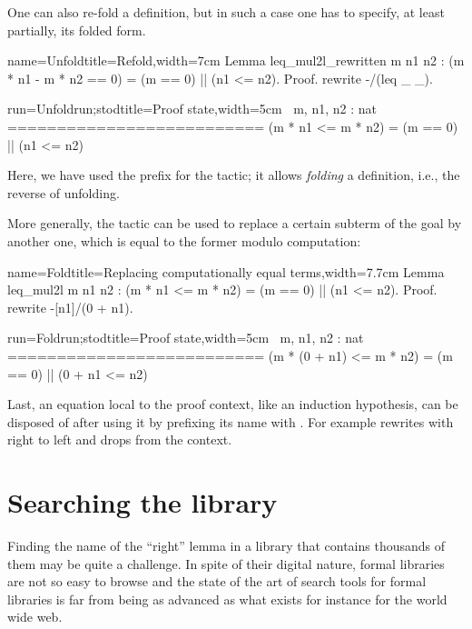 One can also re-fold a definition, but in such a case one has to specify,
at least partially, its folded form.

\begin{coq-left}{name=Unfold}{title=Refold,width=7cm}
Lemma leq_mul2l_rewritten m n1 n2 :
  (m * n1 - m * n2 == 0) =
    (m == 0) || (n1 <= n2).
Proof.
rewrite -/(leq _ _).
\end{coq-left}
\begin{coqout-right}{run=Unfoldrun;stod}{title=Proof state,width=5cm}
$~$
m, n1, n2 : nat
==========================
(m * n1 <= m * n2) =
  (m == 0) || (n1 <= n2)
\end{coqout-right}
Here, we have used the \C{-/} prefix for the  tactic; it
allows \emph{folding} a definition, i.e., the reverse of unfolding.


More generally, the  tactic can be used to replace a
certain subterm of the goal by another one, which is equal to the
former modulo computation:

\begin{coq-left}{name=Fold}{title=Replacing computationally equal terms,width=7.7cm}
Lemma leq_mul2l m n1 n2 :
(m * n1 <= m * n2) = (m == 0) || (n1 <= n2).
Proof.
rewrite -[n1]/(0 + n1).
\end{coq-left}
\begin{coqout-right}{run=Foldrun;stod}{title=Proof state,width=5cm}
$~$
m, n1, n2 : nat
==========================
(m * (0 + n1) <= m * n2) =
  (m == 0) || (0 + n1 <= n2)
\end{coqout-right}

Last, an equation local to the proof context, like an
induction hypothesis, can be disposed of after using it by
prefixing its name with \C{\{\}}.  For example
 rewrites with  right to
left and drops  from the context.


\section{Searching the library}\label{sec:search}

Finding the name of the ``right'' lemma in a library that contains
thousands of them may be quite a challenge. In spite of their digital
nature, formal libraries are not so easy to browse and the state
of the art of search tools for formal libraries is far from being as
advanced as what exists for instance for the world wide web.

